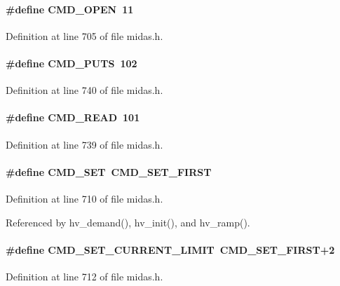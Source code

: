 \paragraph[{CMD\_\-OPEN}]{\setlength{\rightskip}{0pt plus 5cm}\#define CMD\_\-OPEN~11}\hfill\label{group__err26_ga86939db54f743434767a66ab3d6ef790}


Definition at line 705 of file midas.h.
\paragraph[{CMD\_\-PUTS}]{\setlength{\rightskip}{0pt plus 5cm}\#define CMD\_\-PUTS~102}\hfill\label{group__err26_gaea42144cb683ba223ec68c9453e3f143}


Definition at line 740 of file midas.h.
\paragraph[{CMD\_\-READ}]{\setlength{\rightskip}{0pt plus 5cm}\#define CMD\_\-READ~101}\hfill\label{group__err26_ga9c953a6c538020e644127ee080608021}


Definition at line 739 of file midas.h.
\paragraph[{CMD\_\-SET}]{\setlength{\rightskip}{0pt plus 5cm}\#define CMD\_\-SET~CMD\_\-SET\_\-FIRST}\hfill\label{group__err26_gabb268d264836b9443ef23350814c0f68}


Definition at line 710 of file midas.h.

Referenced by hv\_\-demand(), hv\_\-init(), and hv\_\-ramp().
\paragraph[{CMD\_\-SET\_\-CURRENT\_\-LIMIT}]{\setlength{\rightskip}{0pt plus 5cm}\#define CMD\_\-SET\_\-CURRENT\_\-LIMIT~CMD\_\-SET\_\-FIRST+2}\hfill\label{group__err26_ga3f2bdc89e0bd028b914d2a4caf0c5736}


Definition at line 712 of file midas.h.

